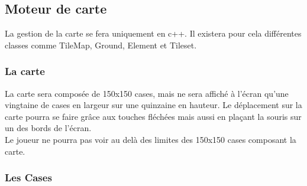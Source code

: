 \documentclass[a4paper]{memoir}
\begin{document}
			\subsection{Moteur de carte}
				La gestion de la carte se fera uniquement en c++. Il existera pour cela différentes classes comme TileMap, Ground, Element et Tileset.
		
				\subsubsection{La carte}

					La carte sera composée de 150x150 cases, mais ne sera affiché à l'écran qu'une vingtaine de cases en largeur sur une quinzaine en hauteur. Le déplacement sur la carte pourra se faire grâce aux touches fléchées mais aussi en plaçant la souris sur un des bords de l'écran.\\
					Le joueur ne pourra pas voir au delà des limites des 150x150 cases composant la carte.

				\subsubsection{Les Cases}
\end{document}
